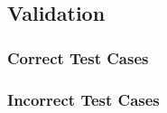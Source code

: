 \subsection{Validation}


\subsubsection{Correct Test Cases}




\subsubsection{Incorrect Test Cases}




%
